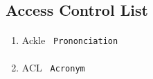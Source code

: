 \subsection*{Access Control List } 
\begin{enumerate}
	\item  \paragraph{} Ackle  \texttt{ Prononciation  }
	\item  \paragraph{} ACL  \texttt{ Acronym  }
\end{enumerate} 